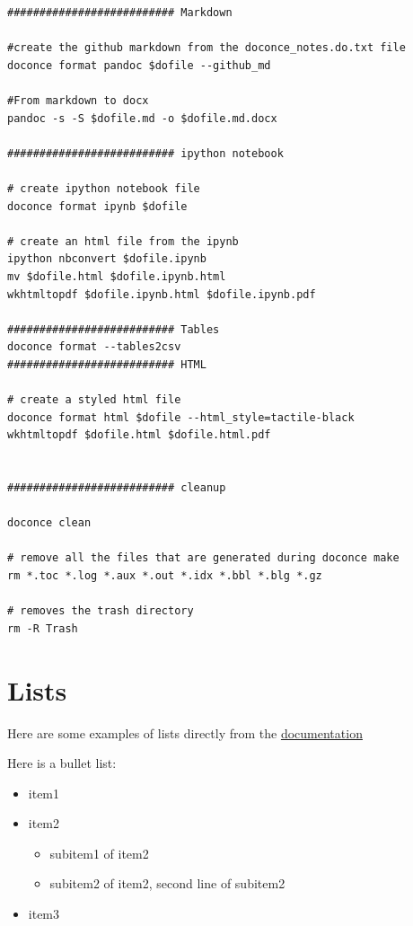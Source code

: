 \documentclass[%
twocolumn,
twoside,                 %
final,                   %
10pt]{article}
\begin{document}
\begin{verbatim}
########################## Markdown 

#create the github markdown from the doconce_notes.do.txt file
doconce format pandoc $dofile --github_md

#From markdown to docx
pandoc -s -S $dofile.md -o $dofile.md.docx

########################## ipython notebook 

# create ipython notebook file
doconce format ipynb $dofile

# create an html file from the ipynb
ipython nbconvert $dofile.ipynb
mv $dofile.html $dofile.ipynb.html
wkhtmltopdf $dofile.ipynb.html $dofile.ipynb.pdf

########################## Tables 
doconce format --tables2csv
########################## HTML 

# create a styled html file
doconce format html $dofile --html_style=tactile-black
wkhtmltopdf $dofile.html $dofile.html.pdf


########################## cleanup 

doconce clean

# remove all the files that are generated during doconce make
rm *.toc *.log *.aux *.out *.idx *.bbl *.blg *.gz

# removes the trash directory
rm -R Trash
\end{verbatim}

\section{Lists}

Here are some examples of lists directly from the \href{{http://hplgit.github.io/doconce/doc/pub/quickref/quickref.html}}{documentation}

Here is a bullet list:

\begin{itemize}
 \item item1

 \item item2
\begin{itemize}

  \item subitem1 of item2

  \item subitem2 of item2,
    second line of subitem2

\end{itemize}

\noindent
 \item item3
\end{itemize}
\end{document}
